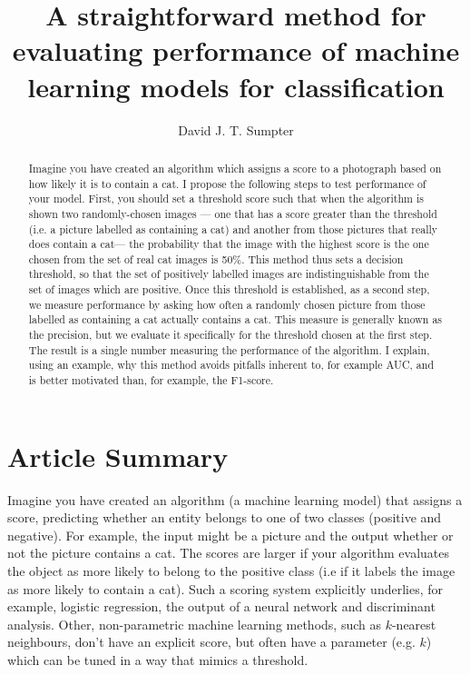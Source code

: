 \documentclass[preprint,12pt]{elsarticle}
\title{A straightforward method for evaluating performance of machine learning models for classification}
\author{David J. T. Sumpter}
\begin{document}

\maketitle

\begin{abstract}
Imagine you have created an algorithm which assigns a score to a photograph based on how likely it is to contain a cat.  I propose the following steps to test performance of your model. First, you should set a threshold score such that when the algorithm is shown two randomly-chosen images --- one that has a score greater than the threshold (i.e. a picture labelled as containing a cat) and another from those pictures that really does contain a cat--- the probability that the image with the highest score is the one chosen from the set of real cat images is 50\%. This method thus sets a decision threshold, so that the set of positively labelled images are indistinguishable from the set of images which are positive. Once this threshold is established, as a second step, we measure performance by asking how often a randomly chosen picture from those labelled as containing a cat actually contains a cat. This measure is generally known as the precision, but we evaluate it specifically for the threshold chosen at the first step. The result is a single number measuring the performance of the algorithm. I explain, using an example, why this method avoids pitfalls inherent to, for example AUC, and is better motivated than, for example, the F1-score.
\end{abstract}

\section{Article Summary}

Imagine you have created an algorithm (a machine learning model) that assigns a score, predicting whether an entity belongs to one of two classes (positive and negative). For example, the input might be a picture and the output whether or not the picture contains a cat. The scores are larger if your algorithm evaluates the object as more likely to belong to the positive class (i.e if it labels the image as more likely to contain a cat). Such a scoring system explicitly underlies, for example, logistic regression, the output of a neural network and discriminant analysis. Other, non-parametric machine learning methods, such as $k$-nearest neighbours, don't have an explicit score, but often have a parameter (e.g. $k$) which can be tuned in a way that mimics a threshold. 
\end{document}
